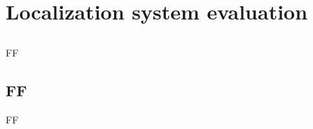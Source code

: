 \chapter{Localization system evaluation} \label{chap:localization-system-evaluation}



\section*{}

FF



\section{FF}

FF
